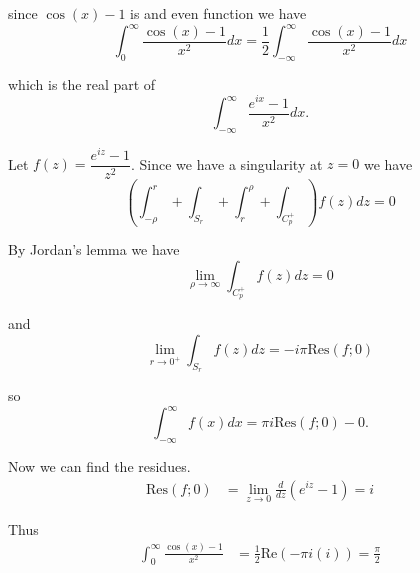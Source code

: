 \documentclass[12pt]{article}
\begin{document}
since $\cos(x) - 1$ is and even function we have
\[
	\int_{0}^{\infty} \frac{\cos(x) - 1}{x^2}dx = \frac{1}{2}\int_{-\infty}^{\infty} \frac{\cos(x) - 1}{x^2}dx
\]

which is the real part of
\[
	\int_{-\infty}^{\infty} \frac{e^{ix} - 1}{x^2}dx.
\]

Let $f(z) = \dfrac{e^{iz} - 1}{z^2}$. Since we have a singularity at $z = 0$ we have
\[
	\left(\int_{-\rho}^{r} + \int_{S_r} + \int_{r}^{\rho} + \int_{C_p^{+}}\right)f(z)dz = 0
\]

By Jordan's lemma we have
\[
	\lim_{\rho \to \infty}\int_{C_p^{+}}f(z)dz = 0
\]

and
\[
	\lim_{r \to 0^{+}}\int_{S_r}f(z)dz = -i\pi \text{Res}(f; 0)
\]

so
\[
	\int_{-\infty}^{\infty} f(x)dx = \pi i \text{Res}(f; 0) - 0.
\]

Now we can find the residues.
\begin{align*}
	\text{Res}(f; 0) &= \lim_{z \to 0} \frac{d}{dz}(e^{iz} - 1) = i
\end{align*}

Thus
\begin{align*}
	\int_{0}^{\infty} \frac{\cos(x) - 1}{x^2} &= \frac{1}{2}\text{Re}\left(-\pi i (i)\right) = \frac{\pi}{2}
\end{align*}
\end{document}

